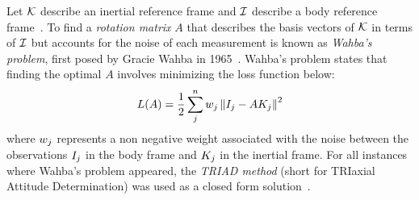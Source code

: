 Let $\mathcal{K}$ describe an inertial reference frame and $\mathcal{I}$ describe a body reference
frame~\cite{wie:spaceVehicleDynamics}.
To find a \textit{rotation matrix} $A$ that describes the basis vectors of $\mathcal{K}$ in terms of $\mathcal{I}$ but accounts
for the noise of each measurement is known as \textit{Wahba's problem}, first posed by Gracie Wahba in
1965~\cite{wahba:attitudeEstimationProblem}.
Wahba's problem states that finding the optimal $A$ involves minimizing the loss function below:
\begin{equation}
    L(A) = \frac{1}{2} \sum_j^n w_j \left\| I_j - AK_j \right\|^2
\end{equation}
where $w_j$ represents a non negative weight associated with the noise between the observations $I_j$
in the body frame and $K_j$ in the inertial frame.
For all instances where Wahba's problem appeared, the \textit{TRIAD method} (short for TRIaxial Attitude Determination)
was used as a closed form solution~\cite{markley:attitudeDeterminationTwoVectors}.

%

